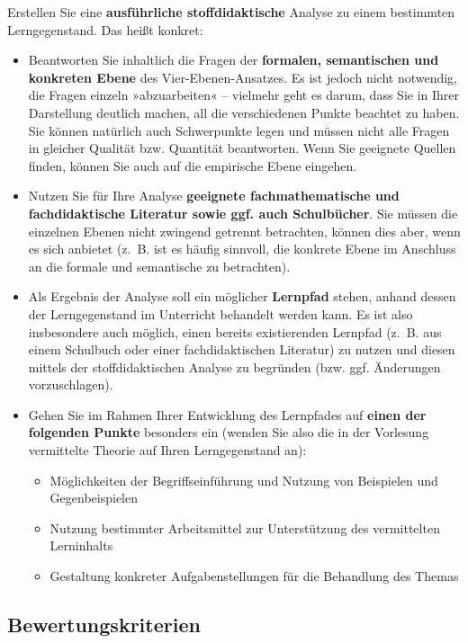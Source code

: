 \documentclass[
  ngerman,
]{scrbook}
\providecommand{\tightlist}{%
  \setlength{\itemsep}{0pt}\setlength{\parskip}{0pt}}
\theoremstyle{definition}
\theoremstyle{definition}
\theoremstyle{definition}
\theoremstyle{definition}
\theoremstyle{remark}
\begin{document}
Erstellen Sie eine \textbf{ausführliche stoffdidaktische} Analyse zu einem bestimmten Lerngegenstand. Das heißt konkret:

\begin{itemize}
\tightlist
\item
  Beantworten Sie inhaltlich die Fragen der \textbf{formalen, semantischen und konkreten Ebene} des Vier-Ebenen-Ansatzes. Es ist jedoch nicht notwendig, die Fragen einzeln »abzuarbeiten« -- vielmehr geht es darum, dass Sie in Ihrer Darstellung deutlich machen, all die verschiedenen Punkte beachtet zu haben. Sie können natürlich auch Schwerpunkte legen und müssen nicht alle Fragen in gleicher Qualität bzw. Quantität beantworten. Wenn Sie geeignete Quellen finden, können Sie auch auf die empirische Ebene eingehen.
\item
  Nutzen Sie für Ihre Analyse \textbf{geeignete fachmathematische und fachdidaktische Literatur sowie ggf. auch Schulbücher}. Sie müssen die einzelnen Ebenen nicht zwingend getrennt betrachten, können dies aber, wenn es sich anbietet (z.~B. ist es häufig sinnvoll, die konkrete Ebene im Anschluss an die formale und semantische zu betrachten).
\item
  Als Ergebnis der Analyse soll ein möglicher \textbf{Lernpfad} stehen, anhand dessen der Lerngegenstand im Unterricht behandelt werden kann. Es ist also insbesondere auch möglich, einen bereits existierenden Lernpfad (z.~B. aus einem Schulbuch oder einer fachdidaktischen Literatur) zu nutzen und diesen mittels der stoffdidaktischen Analyse zu begründen (bzw. ggf. Änderungen vorzuschlagen).
\item
  Gehen Sie im Rahmen Ihrer Entwicklung des Lernpfades auf \textbf{einen der folgenden Punkte} besonders ein (wenden Sie also die in der Vorlesung vermittelte Theorie auf Ihren Lerngegenstand an):

  \begin{itemize}
  \tightlist
  \item
    Möglichkeiten der Begriffseinführung und Nutzung von Beispielen und Gegenbeispielen
  \item
    Nutzung bestimmter Arbeitsmittel zur Unterstützung des vermittelten Lerninhalts
  \item
    Gestaltung konkreter Aufgabenstellungen für die Behandlung des Themas
  \end{itemize}
\end{itemize}

\hypertarget{bewertungskriterien}{%
\subsection{Bewertungskriterien}\label{bewertungskriterien}}
\end{document}
